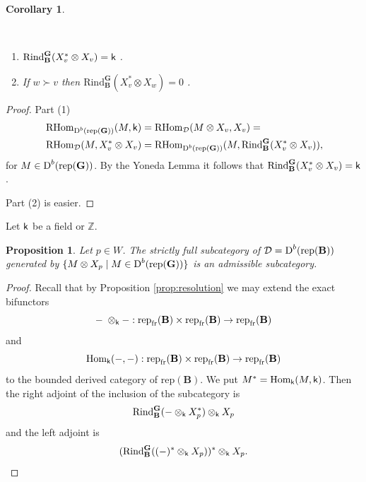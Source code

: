 \documentclass[sn-mathphys-num]{sn-jnl}%
\newcommand{\D}{\mathcal D}
\newcommand{\rep}{{\mathrm{rep}}}
\newcommand{\Rind}{{\mathrm{Rind}}}
\newcommand{\fr}{{\mathrm {fr}}}
\newcommand*{\Dd}{\mathop{\mathrm D\kern0pt}\nolimits}
\newcommand*{\Hom}{\mathop{\mathrm {Hom}}\nolimits}
\newcommand*{\RHom}{\mathop{\mathrm {RHom}}\nolimits}
\newcommand{\sk}{{\sf k}}
\newcommand{\Z}{{\mathbb Z}}
\newcommand{\bg}{\mathbf G}
\newcommand{\fb}{\mathbf B}
\newtheorem{corollary}[theorem]{Corollary}
\newtheorem{proposition}[theorem]{Proposition}
\theoremstyle{definition}
\begin{document}
\begin{corollary}
\label{cor:Rind_B^G(X_p*otimesX_p)}

\

\begin{enumerate}
\item $\Rind_{\fb}^{ \bg}(X_v^{\ast}\otimes X_v)=\sk$ .
\item If $w\succ  v$ then $\Rind _{\fb}^{ \bg}(X_v^{\ast}\otimes X_w)=0$ .
\end{enumerate}
\end{corollary}
\begin{proof}Part (1)
\begin{eqnarray*}&\RHom _{ \Dd^b(\rep(\bg))}( M, \sk)=\RHom_\D(M\otimes X_v, X_v)=\\&\RHom_\D(M, X_v^\ast\otimes X_v)=
\RHom_{\Dd^b(\rep(\bg))}(M,\Rind_\fb^\bg( X_v^\ast\otimes X_v)),
\end{eqnarray*}
for $M\in \Dd^b(\rep(\bg))$. By the Yoneda Lemma it follows that $\Rind_{\fb}^{ \bg}(X_v^{\ast}\otimes X_v)=\sk$.

Part (2) is easier.
\end{proof}
Let $\sk$ be a field or $\Z$.
\begin{proposition}\label{prop:sfX_p-admissibility}
    Let $p\in W$.
    The 
strictly full subcategory of
$\D=\Dd ^b(\rep(\fb))$ generated by $\{M\otimes X_p \mid M\in \Dd ^b(\rep( \bg))\}$
is an admissible subcategory.
\end{proposition}

\begin{proof}
Recall that by Proposition \ref{prop:resolution} we may extend the exact bifunctors
 $$-\;\otimes_\sk-:\rep_\fr( \fb)\times \rep_\fr( \fb)\to \rep_\fr( \fb)$$ and $$\Hom_\sk(-,-):\rep_\fr( \fb)\times \rep_\fr( \fb)\to \rep_\fr( \fb)$$ 
 to the bounded derived category of $\rep( \fb)$. We put $M^*=\Hom_\sk(M,\sk)$.
Then the right adjoint of the inclusion of the subcategory is $$\Rind_ \fb^ \bg(-\otimes_\sk X_p^*)\otimes_\sk X_p$$ 
and the left adjoint is $$(\Rind_ \fb^ \bg((-)^*\otimes_\sk X_p))^*\otimes_\sk X_p.$$
\end{proof}
\end{document}
